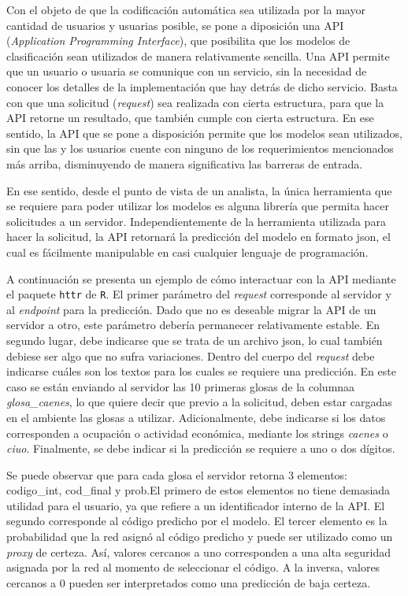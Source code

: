 \documentclass[
  12pt,
  spanish,
]{article}
\begin{document}
Con el objeto de que la codificación automática sea utilizada por la
mayor cantidad de usuarios y usuarias posible, se pone a diposición una
API (\emph{Application Programming Interface}), que posibilita que los
modelos de clasificación sean utilizados de manera relativamente
sencilla. Una API permite que un usuario o usuaria se comunique con un
servicio, sin la necesidad de conocer los detalles de la implementación
que hay detrás de dicho servicio. Basta con que una solicitud
(\emph{request}) sea realizada con cierta estructura, para que la API
retorne un resultado, que también cumple con cierta estructura. En ese
sentido, la API que se pone a disposición permite que los modelos sean
utilizados, sin que las y los usuarios cuente con ninguno de los
requerimientos mencionados más arriba, disminuyendo de manera
significativa las barreras de entrada.

En ese sentido, desde el punto de vista de un analista, la única
herramienta que se requiere para poder utilizar los modelos es alguna
librería que permita hacer solicitudes a un servidor. Independientemente
de la herramienta utilizada para hacer la solicitud, la API retornará la
predicción del modelo en formato json, el cual es fácilmente manipulable
en casi cualquier lenguaje de programación.

A continuación se presenta un ejemplo de cómo interactuar con la API
mediante el paquete \texttt{httr} de \texttt{R}. El primer parámetro del
\emph{request} corresponde al servidor y al \emph{endpoint} para la
predicción. Dado que no es deseable migrar la API de un servidor a otro,
este parámetro debería permanecer relativamente estable. En segundo
lugar, debe indicarse que se trata de un archivo json, lo cual también
debiese ser algo que no sufra variaciones. Dentro del cuerpo del
\emph{request} debe indicarse cuáles son los textos para los cuales se
requiere una predicción. En este caso se están enviando al servidor las
10 primeras glosas de la columnaa \emph{glosa\_caenes}, lo que quiere
decir que previo a la solicitud, deben estar cargadas en el ambiente las
glosas a utilizar. Adicionalmente, debe indicarse si los datos
corresponden a ocupación o actividad económica, mediante los strings
\emph{caenes} o \emph{ciuo}. Finalmente, se debe indicar si la
predicción se requiere a uno o dos dígitos.

Se puede observar que para cada glosa el servidor retorna 3 elementos:
codigo\_int, cod\_final y prob.El primero de estos elementos no tiene
demasiada utilidad para el usuario, ya que refiere a un identificador
interno de la API. El segundo corresponde al código predicho por el
modelo. El tercer elemento es la probabilidad que la red asignó al
código predicho y puede ser utilizado como un \emph{proxy} de certeza.
Así, valores cercanos a uno corresponden a una alta seguridad asignada
por la red al momento de seleccionar el código. A la inversa, valores
cercanos a 0 pueden ser interpretados como una predicción de baja
certeza.
\end{document}
